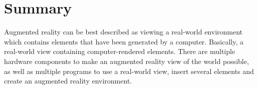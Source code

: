 \chapter*{Summary}
	Augmented reality can be best described as viewing a real-world environment
	which contains elements that have been generated by a computer. Basically,
	a real-world view containing computer-rendered elements. There are multiple
	hardware components to make an augmented reality view of the world possible,
	as well as multiple programs to use a real-world view, insert several
	elements and create an augmented reality environment.